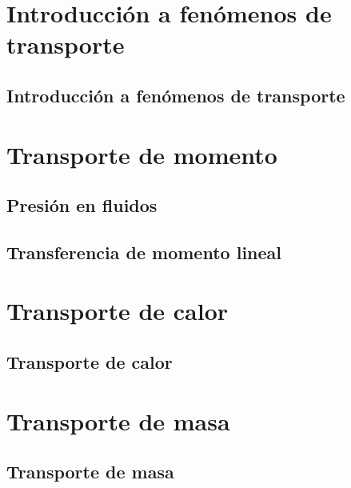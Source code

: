 \documentclass{AsignaturaResumen}
\begin{document}
    \frontmatter

\Portada
\Indices

    \mainmatter


\part{Introducción a fenómenos de transporte}

    \chapter{Introducción a fenómenos de transporte} 

\part{Transporte de momento}

    \chapter{Presión en fluidos} 
    \chapter{Transferencia de momento lineal} 

\part{Transporte de calor}

    \chapter{Transporte de calor} 


\part{Transporte de masa}

    \chapter{Transporte de masa} 

    
    \PlainGeom
    \appendix

    
    \backmatter

\Respuestas
\Bibliografia
\Glosarios
\end{document}
